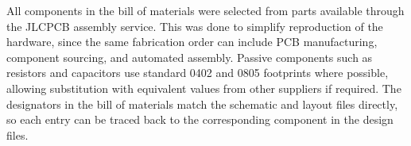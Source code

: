 All components in the bill of materials were selected from parts available 
through the JLCPCB assembly service. This was done to simplify reproduction 
of the hardware, since the same fabrication order can include PCB 
manufacturing, component sourcing, and automated assembly. 
Passive components such as resistors and capacitors use standard 
0402 and 0805 footprints where possible, allowing substitution with 
equivalent values from other suppliers if required. 
The designators in the bill of materials match the schematic and 
layout files directly, so each entry can be traced back to the 
corresponding component in the design files.
